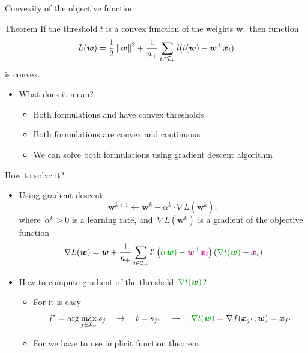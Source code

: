 \documentclass[10pt, aspectratio=169]{beamer}
\begin{document}
\begin{frame}{Convexity of the objective function}
  \begin{block}{Theorem}
    If the threshold $t$ is a convex function of the weights $\bm{w},$ then function
    \begin{equation*}
      L(\bm{w}) = \frac{1}{2} \norm{\bm{w}}^2 + \frac{1}{\npos} \sum_{i \in \Ipos} l(t(\bm{w}) - \bm{w}^{\top} \bm{x}_i)
    \end{equation*}
    is convex.
  \end{block}
  \begin{itemize}
    \item What does it mean? 
    \begin{itemize}
      \item Both formulations \TopPush and \PatMatNP have convex thresholds
      \item Both formulations are convex and continuous
      \item We can solve both formulations using gradient descent algorithm
    \end{itemize}
    
  \end{itemize}
\end{frame}

\begin{frame}{How to solve it?}
  \begin{itemize}
    \item Using gradient descent
    \begin{equation*}
      \bm{w}^{k+1} \gets \bm{w}^k - \alpha^k \cdot \nabla L(\bm{w}^k),
    \end{equation*}
    where~$\alpha^k > 0$ is a learning rate, and~$\nabla L(\bm{w}^k)$ is a gradient of the objective function
    \begin{equation*}
      \nabla L(\bm{w})
        = \bm{w} + \frac{1}{\npos} \sum_{i \in \Ipos} l'\Brac{{\color{mygreen}t(\bm{w})} - {\color{mypurple}\bm{w}^{\top} \bm{x}_i}}\Brac{{\color{mygreen}\nabla t(\bm{w})} - {\color{mypurple}\bm{x}_i}}
    \end{equation*}
    \item How to compute gradient of the threshold~${\color{mygreen}\nabla t(\bm{w})}$?
    \begin{itemize}
      \item For \TopPush it is easy
      \begin{equation*}
        j^{\star} = \arg \max_{j \in \Ineg} s_j \quad \rightarrow \quad 
        t = s_{j^{\star}}\quad \rightarrow \quad 
        {\color{mygreen}\nabla t(\bm{w})} = \nabla f(\bm{x}_{j^{\star}}; \bm{w}) = \bm{x}_{j^{\star}}
      \end{equation*}
      \item For \PatMatNP we have to use implicit function theorem.
    \end{itemize}
  \end{itemize}
\end{frame}
\end{document}
